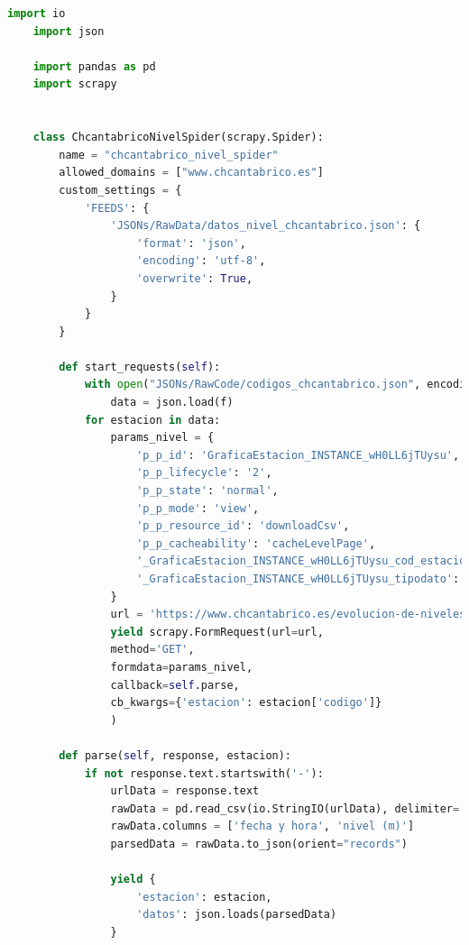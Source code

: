 \begin{lstlisting}[language=Python, caption={Chcantabrico Nivel Spider}]
	import io
	import json
	
	import pandas as pd
	import scrapy
	
	
	class ChcantabricoNivelSpider(scrapy.Spider):
		name = "chcantabrico_nivel_spider"
		allowed_domains = ["www.chcantabrico.es"]
		custom_settings = {
			'FEEDS': {
				'JSONs/RawData/datos_nivel_chcantabrico.json': {
					'format': 'json',
					'encoding': 'utf-8',
					'overwrite': True,
				}
			}
		}
	
		def start_requests(self):
			with open("JSONs/RawCode/codigos_chcantabrico.json", encoding="utf-8") as f:
				data = json.load(f)
			for estacion in data:
				params_nivel = {
					'p_p_id': 'GraficaEstacion_INSTANCE_wH0LL6jTUysu',
					'p_p_lifecycle': '2',
					'p_p_state': 'normal',
					'p_p_mode': 'view',
					'p_p_resource_id': 'downloadCsv',
					'p_p_cacheability': 'cacheLevelPage',
					'_GraficaEstacion_INSTANCE_wH0LL6jTUysu_cod_estacion': f'{estacion["codigo"]}',
					'_GraficaEstacion_INSTANCE_wH0LL6jTUysu_tipodato': 'nivel',
				}
				url = 'https://www.chcantabrico.es/evolucion-de-niveles'
				yield scrapy.FormRequest(url=url,
				method='GET',
				formdata=params_nivel,
				callback=self.parse,
				cb_kwargs={'estacion': estacion['codigo']}
				)
		
		def parse(self, response, estacion):
			if not response.text.startswith('-'):
				urlData = response.text
				rawData = pd.read_csv(io.StringIO(urlData), delimiter=';', encoding='utf-8', header=1)
				rawData.columns = ['fecha y hora', 'nivel (m)']
				parsedData = rawData.to_json(orient="records")
				
				yield {
					'estacion': estacion,
					'datos': json.loads(parsedData)
				}
\end{lstlisting}

